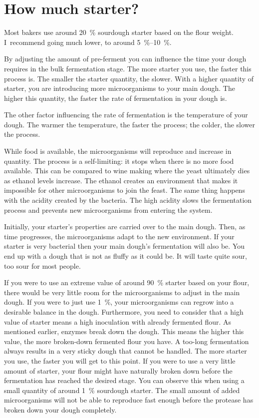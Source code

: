 \section{How much starter?}

Most bakers use around \qty{20}{\percent} sourdough starter based on the
flour weight.  I~recommend going much lower, to around
\qtyrange{5}{10}{\percent}.

By adjusting the amount of pre-ferment you can influence the time your dough
requires in the bulk fermentation stage. The more starter you use, the faster
this process is. The smaller the starter quantity, the slower. With a higher
quantity of starter, you are introducing more microorganisms to your main
dough. The higher this quantity, the faster the rate of fermentation in your
dough is.

The other factor influencing the rate of fermentation is the temperature of
your dough. The warmer the temperature, the faster the process; the colder, the
slower the process.

While food is available, the microorganisms will reproduce and increase in
quantity. The process is a self-limiting: it stops when there is no
more food available. This can be compared to wine making where
the yeast ultimately dies as ethanol levels increase. The ethanol creates an
environment that makes it impossible for other
microorganisms to join the feast. The same thing happens with the acidity
created by the bacteria. The high acidity slows the fermentation process and
prevents new microorganisms from entering the system.

Initially, your starter's properties are carried over to the main dough. Then,
as time progresses, the microorganisms adapt to the new environment. If your
starter is very bacterial then your main dough's fermentation will also be. You
end up with a dough that is not as fluffy as it could be. It will taste quite
sour, too sour for most people.

If you were to use an extreme value of around \qty{90}{\percent} starter based on your flour, there
would be very little room for the microorganisms to adjust in the main dough.
If you were to just use \qty{1}{\percent}, your microorganisms can regrow into a
desirable balance in the dough. Furthermore, you need to consider that a high value
of starter means a high inoculation with already fermented flour. As
mentioned earlier, enzymes break down the dough. This means the higher this
value, the more broken-down fermented flour you have. A too-long fermentation
always results in a very sticky dough that cannot be handled. The more
starter you use, the faster you will get to this point. If you were to use a
very little amount of starter, your flour might have naturally broken down
before the fermentation has reached the desired stage. You can observe this
when using a small quantity of around \qty{1}{\percent} sourdough starter. The small
amount of added microorganisms will not be able to reproduce fast enough
before the protease has broken down your dough completely.

